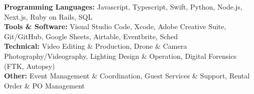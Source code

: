 \noindent
\textbf{Programming Languages:} Javascript, Typescript, Swift, Python, Node.js, Next.js, Ruby on Rails, SQL \\
\textbf{Tools \& Software:} Visual Studio Code, Xcode, Adobe Creative Suite, Git/GitHub, Google Sheets, Airtable, Eventbrite, Sched \\
\textbf{Technical:} Video Editing \& Production, Drone \& Camera Photography/Videography, Lighting Design \& Operation, Digital Forensics (FTK, Autopsy) \\
\textbf{Other:} Event Management \& Coordination, Guest Services \& Support, Rental Order \& PO Management
